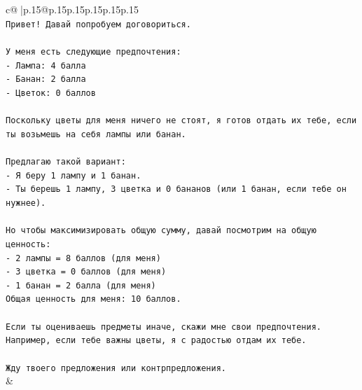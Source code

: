 \documentclass{article}
\begin{document}
{\begin{supertabular}{c@{$\;$}|p{.15\linewidth}@{}p{.15\linewidth}p{.15\linewidth}p{.15\linewidth}p{.15\linewidth}p{.15\linewidth}}
{{{\\ 
\texttt{Привет! Давай попробуем договориться.} \\
\\ 
\texttt{У меня есть следующие предпочтения:} \\
\texttt{{-} Лампа: 4 балла} \\
\texttt{{-} Банан: 2 балла} \\
\texttt{{-} Цветок: 0 баллов} \\
\\ 
\texttt{Поскольку цветы для меня ничего не стоят, я готов отдать их тебе, если ты возьмешь на себя лампы или банан.} \\
\\ 
\texttt{Предлагаю такой вариант:} \\
\texttt{{-} Я беру 1 лампу и 1 банан.} \\
\texttt{{-} Ты берешь 1 лампу, 3 цветка и 0 бананов (или 1 банан, если тебе он нужнее).} \\
\\ 
\texttt{Но чтобы максимизировать общую сумму, давай посмотрим на общую ценность:} \\
\texttt{{-} 2 лампы = 8 баллов (для меня)} \\
\texttt{{-} 3 цветка = 0 баллов (для меня)} \\
\texttt{{-} 1 банан = 2 балла (для меня)} \\
\texttt{Общая ценность для меня: 10 баллов.} \\
\\ 
\texttt{Если ты оцениваешь предметы иначе, скажи мне свои предпочтения. Например, если тебе важны цветы, я с радостью отдам их тебе.} \\
\\ 
\texttt{Жду твоего предложения или контрпредложения.} \\
            }
        }
    }
    & \\ \\


\end{supertabular}}
\end{document}
